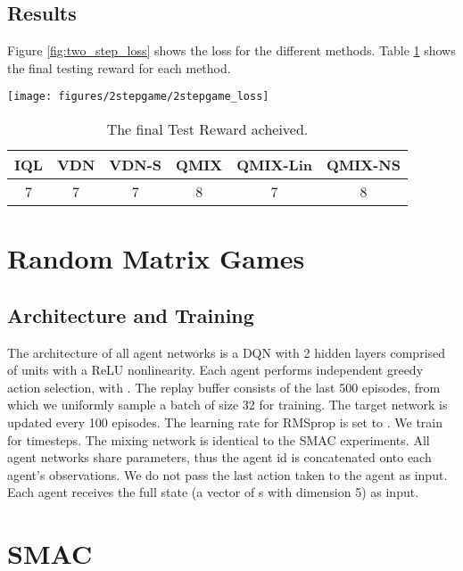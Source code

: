 \documentclass[twoside,11pt]{article}
\begin{document}
\subsection{Results}

Figure \ref{fig:two_step_loss} shows the loss for the different methods. Table \ref{table:final_test_two_step} shows the final testing reward for each method.

\begin{figure*}[htb!]
    \centering
    \texttt{[image: figures/2stepgame/2stepgame\_loss]}
    \caption{Loss for all six methods on the Two Step Game. The mean and 95\% confidence interval is shown across 30 independent runs.}
    \label{fig:two_step_loss}
\end{figure*}

\begin{table}[h]
	\setlength{\extrarowheight}{3pt}
	\centering
    \begin{center}
        \begin{tabular}{|c| c | c | c | c | c |}
        \hline
        \textbf{IQL} & \textbf{VDN} & \textbf{VDN-S} & \textbf{QMIX} & \textbf{QMIX-Lin} & \textbf{QMIX-NS} \\
        \hline
        7 & 7 & 7 & 8 & 7 & 8 \\
        \hline
        \end{tabular}
    \end{center}
    \caption{The final Test Reward acheived.}
    \label{table:final_test_two_step}
\end{table}
 \section{Random Matrix Games} 
\label{sec:rnd_matrix_setup}

\subsection{Architecture and Training}

The architecture of all agent networks is a DQN with 2 hidden layers comprised of  units with a ReLU nonlinearity. Each agent performs independent  greedy action selection, with . 
The replay buffer consists of the last 500 episodes, from which we uniformly sample a batch of size 32 for training. The target network is updated every 100 episodes. The learning rate for RMSprop is set to . We train for  timesteps. 
The mixing network is identical to the SMAC experiments. 
All agent networks share parameters, thus the agent id is concatenated onto each agent's observations. We do not pass the last action taken to the agent as input. Each agent receives the full state (a vector of s with dimension 5) as input. \section{SMAC}\label{appendix:SMAC}
\end{document}
